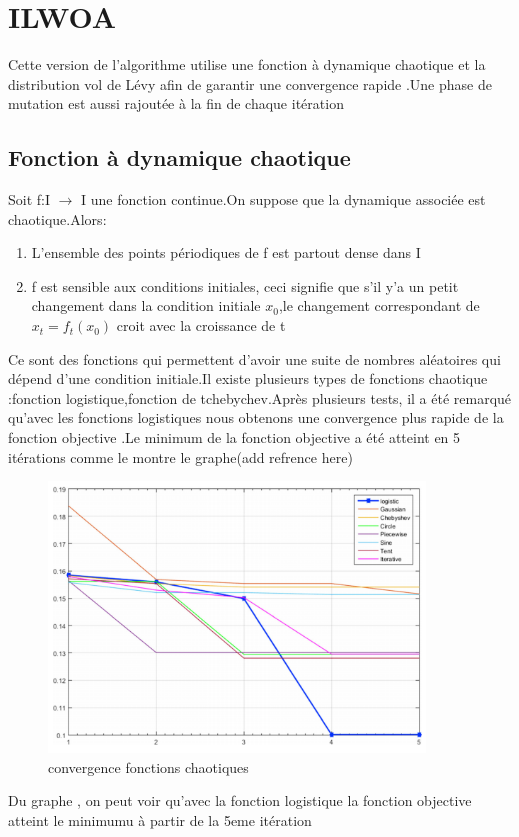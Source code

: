 \documentclass[12pt]{article}
\begin{document}
\section{ILWOA}
    Cette version de l'algorithme utilise une fonction à dynamique chaotique et la distribution vol de Lévy afin de garantir une convergence rapide .Une phase de mutation est aussi rajoutée à la fin de chaque itération
\subsection{Fonction à dynamique chaotique}
Soit f:I $\rightarrow$ I une fonction continue.On suppose que la dynamique associée est chaotique.Alors:
\begin{enumerate}
    \item L'ensemble des points périodiques de f est partout dense dans I 
    \item f est sensible aux conditions initiales, ceci signifie que s'il y'a un petit changement dans la condition initiale $x_0$,le changement correspondant de $x_t=f_t(x_0)$ croit avec la croissance de t 
\end{enumerate}
Ce sont des fonctions qui permettent d'avoir une suite de nombres aléatoires qui dépend d'une condition initiale.Il existe plusieurs types de fonctions chaotique :fonction logistique,fonction de tchebychev.Après plusieurs tests, il a été remarqué qu'avec les fonctions logistiques nous obtenons une convergence plus rapide de la fonction objective .Le minimum de la fonction objective a été atteint en 5 itérations comme le montre le graphe(add refrence here)
\begin{figure}[h!]
   \centering
    \includegraphics[width=10cm]{../figures/logisticvsothers.PNG}
    \caption[\small]{convergence fonctions chaotiques}
\end{figure}
Du graphe , on peut voir qu'avec la fonction logistique la fonction objective atteint le minimumu à partir de la 5eme itération
\end{document}
